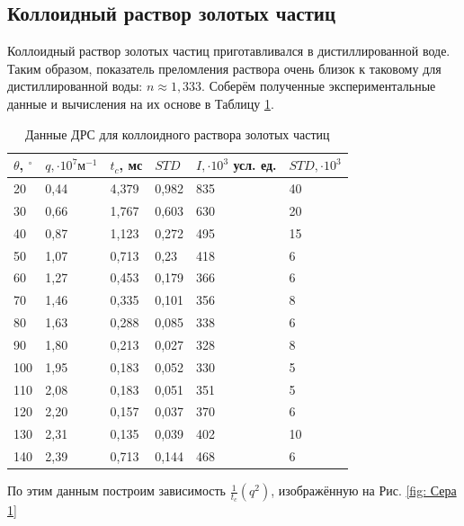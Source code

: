 \documentclass{article}
\begin{document}
\subsection{Коллоидный раствор золотых частиц}\;
\par Коллоидный раствор золотых частиц приготавливался в дистиллированной воде. Таким образом, показатель преломления раствора очень близок к таковому для дистиллированной воды: $n \approx 1,333$. Соберём полученные экспериментальные данные и вычисления на их основе в Таблицу \ref{Таблица 1}.
\begin{table}[h!]
\centering
\caption{Данные ДРС для коллоидного раствора золотых частиц}
\label{Таблица 1}
\begin{tabular}{|l|l|l|l|l|l|}
\hline
$\theta$, $^{\circ}$ & $q, \cdot 10^7 \text{м}^{-1}$  & $t_{c}$, мс & $STD$ & $I, \cdot 10^3$ усл. ед. & $STD, \cdot 10^3$ \\ \hline
20 & 0,44 &  4,379 &  0,982 &  835 &  40 \\ \hline
30 & 0,66 &  1,767 &  0,603 &  630 &  20 \\ \hline
40 & 0,87 &  1,123 &  0,272 &  495 &  15 \\ \hline
50 & 1,07 &  0,713 &  0,23 &  418 &  6 \\ \hline
60 & 1,27 &  0,453 &  0,179 &  366 &  6 \\ \hline
70 & 1,46 &  0,335 &  0,101 &  356 &  8 \\ \hline
80 & 1,63 &  0,288 &  0,085 &  338 &  6 \\ \hline
90 & 1,80 &  0,213 &  0,027 &  328 &  8 \\ \hline
100 & 1,95 &  0,183 &  0,052 &  330 &  5 \\ \hline
110 & 2,08 &  0,183 &  0,051 &  351 &  5 \\ \hline
120 & 2,20 &  0,157 &  0,037 &  370 &  6 \\ \hline
130 & 2,31 &  0,135 &  0,039 &  402 &  10 \\ \hline
140 & 2,39 &  0,713 &  0,144 &  468 &  6 \\ \hline
\end{tabular}
\end{table}
По этим данным построим зависимость $\frac{1}{t_c}(q^2)$, изображённую на Рис. \ref{fig: Сера 1} 
\end{document}
